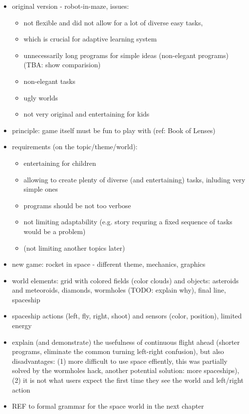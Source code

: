 \begin{itemize}
\item original version - robot-in-maze, issues:
  \begin{itemize}
  \item not flexible and did not allow for a lot of diverse easy tasks,
  \item which is crucial for adaptive learning system
  \item unnecessarily long programs for simple ideas (non-elegant programs) (TBA: show comparision)
  \item non-elegant tasks
  \item ugly worlds
  \item not very original and entertaining for kids
  \end{itemize}
\item principle: game itself must be fun to play with (ref: Book of Lenses)
\item requirements (on the topic/theme/world):
  \begin{itemize}
  \item entertaining for children
  \item allowing to create plenty of diverse (and entertaining) tasks, inluding very simple ones
  \item programs should be not too verbose
  \item not limiting adaptability (e.g. story requring a fixed sequence of tasks would be a problem)
  \item (not limiting another topics later)
  \end{itemize}
\item new game: rocket in space - different theme, mechanics, graphics
\item world elements: grid with colored fields (color clouds) and objects: asteroids and meteoroids, diamonds, wormholes (TODO: explain why), final line, spaceship
\item spaceship actions (left, fly, right, shoot) and sensors (color, position), limited energy
\item explain (and demonstrate) the usefulness of continuous flight ahead (shorter programs, eliminate the common turning left-right confusion), but also disadvantages: (1) more difficult to use space effiently, this was partially solved by the wormholes hack, another potential solution: more spaceships), (2) it is not what users expect the first time they see the world and left/right action
\item REF to formal grammar for the space world in the next chapter
\end{itemize}


